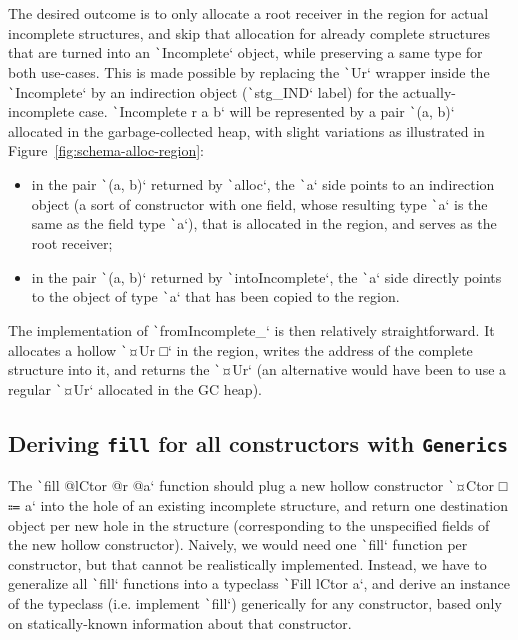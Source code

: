 \documentclass[english]{jflart}
\begin{document}
The desired outcome is to only allocate a root receiver in the region for actual incomplete structures, and skip that allocation for already complete structures that are turned into an \texttt`Incomplete` object, while preserving a same type for both use-cases. This is made possible by replacing the \texttt`Ur` wrapper inside the \texttt`Incomplete` by an indirection object (\texttt`stg_IND` label) for the actually-incomplete case. \texttt`Incomplete r a b` will be represented by a pair \texttt`(a, b)` allocated in the garbage-collected heap, with slight variations as illustrated in Figure~\ref{fig:schema-alloc-region}:
\begin{itemize}
  \item in the pair \texttt`(a, b)` returned by \texttt`alloc`, the \texttt`a` side points to an indirection object (a sort of constructor with one field, whose resulting type \texttt`a` is the same as the field type \texttt`a`), that is allocated in the region, and serves as the root receiver;
  \item in the pair \texttt`(a, b)` returned by \texttt`intoIncomplete`, the \texttt`a` side directly points to the object of type \texttt`a` that has been copied to the region.
\end{itemize}

The implementation of \texttt`fromIncomplete_` is then relatively straightforward. It allocates a hollow \texttt`¤Ur □` in the region, writes the address of the complete structure into it, and returns the \texttt`¤Ur` (an alternative would have been to use a regular \texttt`¤Ur` allocated in the GC heap).

\subsection{Deriving \texttt{fill} for all constructors with \texttt{Generics}}\label{ssec:impl-generics}

The \texttt`fill @lCtor @r @a` function should plug a new hollow constructor \texttt`¤Ctor □ ⩴ a` into the hole of an existing incomplete structure, and return one destination object per new hole in the structure (corresponding to the unspecified fields of the new hollow constructor). Naively, we would need one \texttt`fill` function per constructor, but that cannot be realistically implemented. Instead, we have to generalize all \texttt`fill` functions into a typeclass \texttt`Fill lCtor a`, and derive an instance of the typeclass (i.e. implement \texttt`fill`) generically for any constructor, based only on statically-known information about that constructor.
\end{document}
